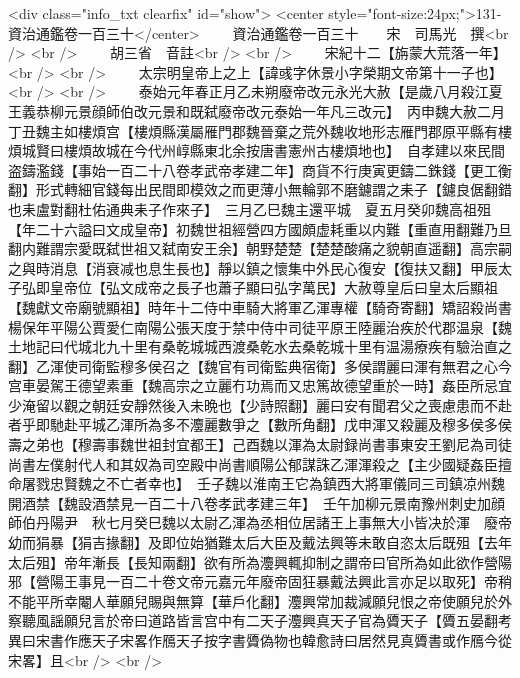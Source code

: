 <div class="info_txt clearfix" id="show">
<center style="font-size:24px;">131-資治通鑑卷一百三十</center>
  　　資治通鑑卷一百三十　　宋　司馬光　撰<br />
<br />
　　胡三省　音註<br />
<br />
　　宋紀十二【旃蒙大荒落一年】<br />
<br />
　　太宗明皇帝上之上【諱彧字休景小字榮期文帝第十一子也】<br />
<br />
　　泰始元年春正月乙未朔廢帝改元永光大赦【是歲八月殺江夏王義恭柳元景顔師伯改元景和既弑廢帝改元泰始一年凡三改元】　丙申魏大赦二月丁丑魏主如樓煩宫【樓煩縣漢屬雁門郡魏晉棄之荒外魏收地形志雁門郡原平縣有樓煩城賢曰樓煩故城在今代州崞縣東北余按唐書憲州古樓煩地也】　自孝建以來民間盗鑄濫錢【事始一百二十八卷孝武帝孝建二年】商貨不行庚寅更鑄二銖錢【更工衡翻】形式轉細官錢每出民間即模效之而更薄小無輪郭不磨鑢謂之耒子【鑢良倨翻錯也耒盧對翻杜佑通典耒子作來子】　三月乙巳魏主還平城　夏五月癸卯魏高祖殂【年二十六謚曰文成皇帝】初魏世祖經營四方國頗虚耗重以内難【重直用翻難乃旦翻内難謂宗愛既弑世祖又弑南安王余】朝野楚楚【楚楚酸痛之貌朝直遥翻】高宗嗣之與時消息【消衰减也息生長也】靜以鎮之懷集中外民心復安【復扶又翻】甲辰太子弘即皇帝位【弘文成帝之長子也蕭子顯曰弘字萬民】大赦尊皇后曰皇太后顯祖【魏獻文帝廟號顯祖】時年十二侍中車騎大將軍乙渾專權【騎奇寄翻】矯詔殺尚書楊保年平陽公賈愛仁南陽公張天度于禁中侍中司徒平原王陸麗治疾於代郡温泉【魏土地記曰代城北九十里有桑乾城城西渡桑乾水去桑乾城十里有温湯療疾有驗治直之翻】乙渾使司衛監穆多侯召之【魏官有司衛監典宿衛】多侯謂麗曰渾有無君之心今宫車晏駕王德望素重【魏高宗之立麗冇功焉而又忠篤故德望重於一時】姦臣所忌宜少淹留以觀之朝廷安靜然後入未晩也【少詩照翻】麗曰安有聞君父之喪慮患而不赴者乎即馳赴平城乙渾所為多不灋麗數爭之【數所角翻】戊申渾又殺麗及穆多侯多侯壽之弟也【穆壽事魏世祖封宜都王】己酉魏以渾為太尉録尚書事東安王劉尼為司徒尚書左僕射代人和其奴為司空殿中尚書順陽公郁謀誅乙渾渾殺之【主少國疑姦臣擅命屠戮忠賢魏之不亡者幸也】　壬子魏以淮南王它為鎮西大將軍儀同三司鎮凉州魏開酒禁【魏設酒禁見一百二十八卷孝武孝建三年】　壬午加柳元景南豫州刺史加顔師伯丹陽尹　秋七月癸巳魏以太尉乙渾為丞相位居諸王上事無大小皆决於渾　廢帝幼而狷暴【狷吉掾翻】及即位始猶難太后大臣及戴法興等未敢自恣太后既殂【去年太后殂】帝年漸長【長知兩翻】欲有所為灋興輒抑制之謂帝曰官所為如此欲作營陽邪【營陽王事見一百二十卷文帝元嘉元年廢帝固狂暴戴法興此言亦足以取死】帝稍不能平所幸閹人華願兒賜與無算【華戶化翻】灋興常加裁減願兒恨之帝使願兒於外察聽風謡願兒言於帝曰道路皆言宫中有二天子灋興真天子官為贗天子【贗五晏翻考異曰宋書作應天子宋畧作鴈天子按字書贗偽物也韓愈詩曰居然見真贗書或作鴈今從宋畧】且<br />
<br />
